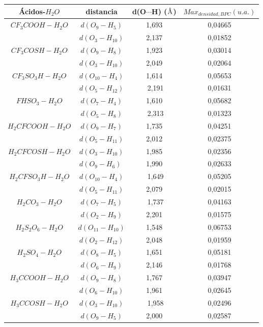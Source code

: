 \begin{table}[H]
	\centering
	\begin{tabular}{|c|c|c|c|}
		\hline
		Ácidos-$H_2O$ & distancia	& d(O$\cdots$H) ($\mbox{\normalfont\AA}$) & $Max_{densidad, BPC} (u. a.)$ \\ \hline
		$CF_3COOH-H_2O$ & $d(O_9-H_5)$ &1,693&0,04665\\ \cline{2-4}
& $d(O_3-H_{10})$ & 2,137 & 0,01852 \\ \hline
 $CF_3COSH-H_2O$ & $d(O_9-H_8)$	 & 1,923 & 0,03014 \\ \cline{2-4}
	& $d(O_3-H_{10})$ & 2,049 & 0,02064 \\ \hline
	$CF_3SO_3H-H_2O$ & $d(O_{10}-H_4)$ & ﻿1,614 & 0,05653 \\ \cline{2-4}
	& $d(O_5-H_{12})$	&﻿ 2,191 &	0,01631 \\ \hline
 $FHSO_3-H_2O$	& $d(O_7-H_4)$ & 1,610 &	0,05682 \\ \cline{2-4}
	& $d(O_5-H_8)$	&﻿ 2,313	& 0,01323 \\ \hline
 $H_2CFCOOH-H_2O$	&$d(O_9-H_7)$ & 1,735	& 0,04251 \\ \cline{2-4}
	& $d(O_5-H_{11})$ & 2,012	& 0,02375 \\ \hline
 $H_2CFCOSH-H_2O$ &	$d(O_3-H_{10})$ & 1,985 &	0,02356 \\ \cline{2-4}
	& $d(O_9-H_6)$ ﻿& 1,990	& 0,02633 \\ \hline
 $H_2CFSO_3H-H_2O$ &	$d(O_{10}-H_4)$	&﻿ 1,649	& 0,05205 \\ \cline{2-4}
	& $d(O_5-H_{11})$ & 2,079	& 0,02015 \\ \hline
 $H_2CO_3-H_2O$	& $d(O_7-H_5)$	&﻿ 1,737	& 0,04163 \\ \cline{2-4}
	& $d(O_2-H_9)$ & 2,201	& 0,01575 \\ \hline
 $H_2S_2O_6-H_2O$ &	$d(O_{11}-H_{10})$	& ﻿1,548 &	0,06753 \\ \cline{2-4}
	& $d(O_2-H_{12})$ & 2,048 &	0,01959 \\ \hline
 $H_2SO_4-H_2O$	& $d(O_8-H_5)$ & 1,651	& 0,05181 \\ \cline{2-4}
	& $d(O_6-H_9)$ & 2,146	& 0,01768 \\ \hline
 $H_3CCOOH-H_2O$ & $d(O_9-H_8)$ & 1,767	& 0,03947 \\ \cline{2-4}
	& $d(O_6-H_{10})$ & 1,961 &	0,02645 \\ \hline
 $H_3CCOSH-H_2O$ &	$d(O_3-H_{10})$	&﻿ 1,958 &	0,02496 \\ \cline{2-4}
	& $d(O_9-H_5)$	& ﻿2,000	& 0,02587 \\ \hline

\end{tabular}
\end{table}

